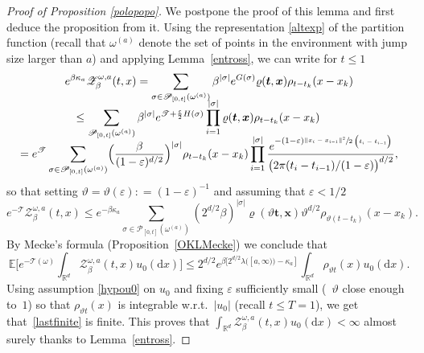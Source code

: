 \documentclass[JEP,XML,SOM,Unicode,published]{cedram}
\let\mathcal\mathscr
\theoremstyle{definition}
\newcommand{\bt}{\boldsymbol{t}}
\newcommand{\bx}{\boldsymbol{x}}
\newcommand{\dd}{\mathrm{d}}
\newcommand{\cP}{{\ensuremath{\mathcal P}} }
\newcommand{\cT}{{\ensuremath{\mathcal T}} }
\newcommand{\cZ}{{\ensuremath{\mathcal Z}} }
\newcommand{\bbE}{{\ensuremath{\mathbb E}} }
\newcommand{\bbR}{{\ensuremath{\mathbb R}} }
\let\gb\beta
\let\gep\varepsilon
\let\gl\lambda
\let\go\omega
\begin{document}
\begin{proof}[Proof of Proposition \ref{polopopo}]
We postpone the proof of this lemma and first deduce the proposition from it.
Using the representation \eqref{altexp} of the partition function (recall that $\go^{(a)}$ denote the set of points in the environment with jump size larger than $a$)
and applying Lemma~\ref{entross},
we can write for $t\le 1$
\begin{multline*}
e^{\beta \kappa_a}\cZ^{\go,a}_{\beta}(t,x)=\sum_{\sigma\in \cP_{[0,t]}(\go^{(a)})}\beta^{|\sigma|} e^{G(\sigma)} \varrho(\bt,\bx)\rho_{t-t_k}(x-x_k)\\[-8pt]
\hspace*{-7mm}\le \sum_{\cP_{[0,t]}(\go^{(a)})}\beta^{|\sigma|} e^{\cT+ \frac \gep 2 H(\sigma)} \prod_{i=1}^{|\sigma|} \varrho(\bt,\bx)\rho_{t-t_k}(x-x_k)\\[-8pt]
= e^{\cT} \sum_{\sigma\in \cP_{[0,t]}(\go^{(a)})} \Bigl(\frac{\beta}{(1-\gep)^{d/2}} \Bigr)^{|\sigma|} \rho_{t-t_k}(x-x_k) \prod_{i=1}^{ |\sigma|} \frac{e^{- (1-\gep)\sfrac{\|x_i-x_{i-1} \|^2}{2\left(t_i-t_{i-1}\right)}}}{ \bigl(2\pi (t_i-t_{i-1}) /(1-\gep)\bigr)^{d/2}},
\end{multline*}
so that setting $\vartheta =\vartheta(\gep): = (1-\gep)^{-1}$ and assuming that $\gep<1/2$
\begin{equation}
e^{-\cT} \cZ^{\go,a}_{\beta}(t,x) \leq e^{ -\gb \kappa_a} \sum_{\sigma\in \cP_{[0,t]}(\go^{(a)})}(2^{d/2}\beta)^{|\sigma|} \varrho(\vartheta \bt,\bx) \vartheta^{d/2} \rho_{ \vartheta (t-t_k)}(x-x_k).
\end{equation}
By Mecke's formula (Proposition~\ref{OKLMecke}) we conclude
that
\begin{equation}
\label{lastfinite}
\bbE\biggl[e^{-\cT(\go)}\int_{\bbR^d} \cZ^{\go, a}_{\beta}(t,x) u_0(\dd x)\biggr]\le 2^{d/2} e^{\beta [ 2^{d/2} \gl([a,\infty))-\kappa_a ]}\int_{\bbR^d } \rho_{ \vartheta t}(x) u_0(\dd x).
\end{equation}
Using assumption \eqref{hypou0} on $u_0$ and
fixing $\gep$ sufficiently small (\ie \ $\vartheta$ close enough to~$1$) so that $\rho_{ \vartheta t}(x)$
is integrable w.r.t.\ $|u_0|$ (recall $t\leq T =1$),
we get that~\eqref{lastfinite} is finite.
This proves that $\int_{\bbR^d} \cZ^{\go,a}_{\beta}(t,x)u_0(\dd x)<\infty$ almost surely thanks to Lemma~\ref{entross}.
\end{proof}
\end{document}
